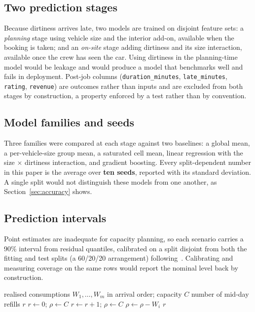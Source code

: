 \documentclass[conference]{IEEEtran}
\begin{document}
\subsection{Two prediction stages}
Because dirtiness arrives late, two models are trained on disjoint feature sets: a
\emph{planning} stage using vehicle size and the interior add-on, available when the booking is
taken; and an \emph{on-site} stage adding dirtiness and its size interaction, available once
the crew has seen the car. Using dirtiness in the planning-time model would be leakage and
would produce a model that benchmarks well and fails in deployment. Post-job columns
(\texttt{duration\_minutes}, \texttt{late\_minutes}, \texttt{rating}, \texttt{revenue}) are
outcomes rather than inputs and are excluded from both stages by construction, a property
enforced by a test rather than by convention.

\subsection{Model families and seeds}
Three families were compared at each stage against two baselines: a global mean, a
per-vehicle-size group mean, a saturated cell mean, linear regression with the size $\times$
dirtiness interaction, and gradient boosting. Every split-dependent number in this paper is the
average over \textbf{ten seeds}, reported with its standard deviation. A single split would not
distinguish these models from one another, as Section~\ref{sec:accuracy} shows.

\subsection{Prediction intervals}
Point estimates are inadequate for capacity planning, so each scenario carries a 90\% interval
from residual quantiles, calibrated on a split disjoint from both the fitting and test splits
(a 60/20/20 arrangement) following~\cite{lei2018conformal}. Calibrating and measuring coverage
on the same rows would report the nominal level back by construction.

\begin{algorithm}[t]
\caption{Refills needed for one crew-day}
\label{alg:refill}
\begin{algorithmic}[1]
\Require realised consumptions $W_1, \dots, W_m$ in arrival order; capacity $C$
\Ensure number of mid-day refills $r$
\State $r \gets 0$; \quad $\rho \gets C$ 
   
    \State $r \gets r + 1$; \quad $\rho \gets C$
  \EndIf
  \State $\rho \gets \rho - W_i$
\EndFor
\State \Return $r$
\end{algorithmic}
\end{algorithm}
\end{document}
